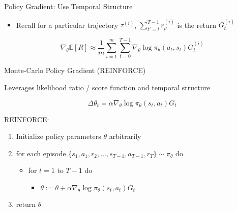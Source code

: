 \documentclass[aspectratio=169]{../latex_main/tntbeamer}  %
\begin{document}
\begin{frame}[c]{Policy Gradient: Use Temporal Structure}
	
\begin{itemize}
	\item Recall for a particular trajectory $\tau^{(i)}$, $\sum_{t'=t}^{T-1} r_{t'}^{(i)}$ is the return $G_t^{(i)}$
\end{itemize}

$$\nabla_\theta \mathbb{E}[R] \approx \frac{1}{m} \sum_{i=1}^m \sum_{t=0}^{T-1} \nabla_\theta \log \pi_\theta (a_t,s_t) G_t^{(i)} $$
	
	
\end{frame}
\begin{frame}[c]{Monte-Carlo Policy Gradient (REINFORCE)}
	
Leverages likelihood ratio / score function and temporal structure

$$ \Delta \theta_t = \alpha \nabla_\theta \log \pi_\theta (s_t, a_t) G_t $$
	
	
REINFORCE:
\begin{enumerate}
	\item Initialize policy parameters $\theta$ arbitrarily
	\item for each episode $\{s_1, a_1, r_2, \ldots, s_{T-1}, a_{T-1}, r_T \} \sim \pi_\theta $ do
	\begin{itemize}
		\item for $t=1$ to $T - 1$ do
		\begin{itemize}
			\item $\theta := \theta + \alpha \nabla_\theta \log \pi_\theta (s_t, a_t) G_t $
		\end{itemize}
	\end{itemize}
	\item return $\theta$
\end{enumerate}

	
\end{frame}
\end{document}
